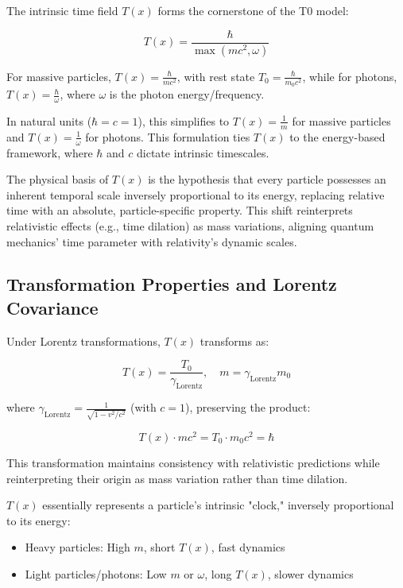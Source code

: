 \documentclass[aps,prl,twocolumn,superscriptaddress,nofootinbib]{revtex4-2}
\newcommand{\Tfield}{T(x)}
\newcommand{\Tzero}{T_0}
\newcommand{\gammaf}{\gamma_{\text{Lorentz}}}
\begin{document}
	The intrinsic time field $\Tfield$ forms the cornerstone of the T0 model:
	
	\begin{equation}
		\Tfield = \frac{\hbar}{\max(mc^2, \omega)}
		\label{eq:intrinsic_time}
	\end{equation}
	
	For massive particles, $\Tfield = \frac{\hbar}{mc^2}$, with rest state $\Tzero = \frac{\hbar}{m_0 c^2}$, while for photons, $\Tfield = \frac{\hbar}{\omega}$, where $\omega$ is the photon energy/frequency.
	
	In natural units ($\hbar = c = 1$), this simplifies to $\Tfield = \frac{1}{m}$ for massive particles and $\Tfield = \frac{1}{\omega}$ for photons. This formulation ties $\Tfield$ to the energy-based framework, where $\hbar$ and $c$ dictate intrinsic timescales.
	
	The physical basis of $\Tfield$ is the hypothesis that every particle possesses an inherent temporal scale inversely proportional to its energy, replacing relative time with an absolute, particle-specific property. This shift reinterprets relativistic effects (e.g., time dilation) as mass variations, aligning quantum mechanics' time parameter with relativity's dynamic scales.
	
	\subsection{Transformation Properties and Lorentz Covariance}
	\label{subsec:transformations}
	
	Under Lorentz transformations, $\Tfield$ transforms as:
	
	\begin{equation}
		\Tfield = \frac{\Tzero}{\gammaf}, \quad m = \gammaf m_0
		\label{eq:transform}
	\end{equation}
	
	where $\gammaf = \frac{1}{\sqrt{1 - v^2/c^2}}$ (with $c = 1$), preserving the product:
	
	\begin{equation}
		\Tfield \cdot m c^2 = \Tzero \cdot m_0 c^2 = \hbar
		\label{eq:invariant_product}
	\end{equation}
	
	This transformation maintains consistency with relativistic predictions while reinterpreting their origin as mass variation rather than time dilation.
	
	$\Tfield$ essentially represents a particle's intrinsic "clock," inversely proportional to its energy:
	\begin{itemize}
		\item Heavy particles: High $m$, short $\Tfield$, fast dynamics
		\item Light particles/photons: Low $m$ or $\omega$, long $\Tfield$, slower dynamics
	\end{itemize}
	
\end{document}
